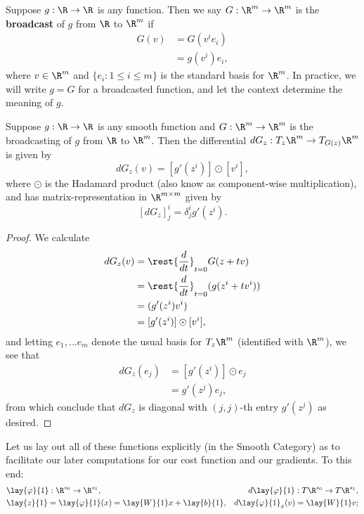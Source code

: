 \begin{defn}
	Suppose $g:\R\to\R$ is any function.  Then we say $G:\R^{m}\to\R^{m}$ is the \textbf{broadcast} of $g$ from $\R$ to $\R^m$ if
	\begin{align*}
		G(v)&=G(v^ie_i)\\
		&=g(v^i)e_i,
	\end{align*}
	where $v\in\R^{m}$ and $\{e_i:1\leq i\leq m\}$ is the standard basis for $\R^{m}$.  In practice, we will write $g=G$ for a broadcasted function, and let the context determine the meaning of $g$.
\end{defn}

\begin{lem}\label{lem: broadcastingDifferential}
	Suppose $g:\R\to\R$ is any smooth function and $G:\R^m\to\R^m$ is the broadcasting of $g$ from $\R$ to $\R^m$.  Then the differential $dG_z:T_z\R^m\to T_{G(z)}\R^m$ is given by
	$$dG_z(v)=[g'(z^i)]\odot [v^i],$$
	where $\odot$ is the Hadamard product (also know as component-wise multiplication), and has matrix-representation in $\R^{m\times m}$ given by
	$$[dG_z]^i_j =\delta^i_j g'(z^i).$$
\end{lem}

\begin{proof}
	We calculate
	\begin{align*}
		dG_z(v)&=\rest{\frac{d}{dt}}_{t=0}G(z+tv)\\
		&=\rest{\frac{d}{dt}}_{t=0}(g(z^i+tv^i))\\
		&=(g'(z^i)v^i)\\
		&=[g'(z^i)]\odot[v^i],
	\end{align*}
	and letting $e_1,...e_m$ denote the usual basis for $T_z\R^m$ (identified with $\R^m$), we see that
	\begin{align*}
		dG_z(e_j)&=[g'(z^i)]\odot e_j\\
		&=g'(z^j)e_j,
	\end{align*}
	from which conclude that $dG_z$ is diagonal with $(j,j)$-th entry $g'(z^j)$ as desired.
\end{proof}

Let us lay out all of these functions explicitly (in the Smooth Category) as to facilitate our later computations for our cost function and our gradients.
To this end:
\begin{align*}
	&\lay{\varphi}{1}:\R^{s_0}\to\R^{s_1},\qquad &d\lay{\varphi}{1}:T\R^{s_0}\to T\R^{s_1},\\
	&\lay{z}{1}=\lay{\varphi}{1}(x)=\lay{W}{1}x+\lay{b}{1},&d\lay{\varphi}{1}_x(v)=\lay{W}{1}v;
\end{align*}

